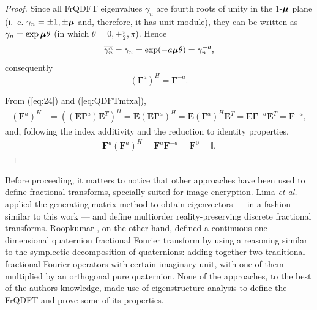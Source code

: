 \begin{itemize}
\begin{proof}
Since all FrQDFT eigenvalues $ \gamma_n $ are fourth roots of unity in the 1-$\boldsymbol{\mu} $ plane (i.~e. $ \gamma_n = \pm 1, \pm \boldsymbol{\mu} $ and, therefore, it has unit module), they can be written as $ \gamma_n = \exp \boldsymbol{\mu} \theta $ (in which $ \theta = 0, \pm \frac{\pi}{2}, \pi $). Hence
\begin{equation}
\overline{\gamma^a_n} = \gamma_n = \exp (-a \boldsymbol{\mu} \theta) = \gamma^{-a}_n,
\end{equation}
consequently
\begin{equation}
\label{eq:24}
(\mathbf{\Gamma}^a)^H = \mathbf{\Gamma}^{-a}.
\end{equation}

From (\ref{eq:24}) and (\ref{eq:QDFTmtxa}),
\begin{equation}
\begin{aligned}
(\mathbf{F}^a)^H &=  \left((\mathbf{E} \mathbf{\Gamma}^a) \mathbf{E}^T \right)^H =  \mathbf{E} \left(\mathbf{E} \mathbf{\Gamma}^a  \right)^H =
\mathbf{E} (\mathbf{\Gamma}^{a})^H \mathbf{E}^T = \mathbf{E} \mathbf{\Gamma}^{-a} \mathbf{E}^T = \mathbf{F}^{-a},
\end{aligned}
\end{equation}
and, following the index additivity and the reduction to identity properties,
\begin{equation}
\begin{aligned}
\mathbf{F}^a (\mathbf{F}^a)^H = \mathbf{F}^a \mathbf{F}^{-a} = \mathbf{F}^0= \mathbb{I}.
\end{aligned}
\end{equation}
\end{proof}
\end{itemize}

Before proceeding, it matters to notice that other approaches have been used to define fractional transforms, specially suited for image encryption. Lima \textit{et al.} \cite{figueiredo2018} applied the generating matrix method to obtain eigenvectors --- in a fashion similar to this work --- and define multiorder reality-preserving discrete fractional transforms. Roopkumar \cite{roopkumar2016quaternionic}, on the other hand, defined a {continuous} one-dimensional quaternion fractional Fourier transform by using a reasoning similar to the symplectic decomposition of quaternions: adding together two traditional fractional Fourier operators with certain imaginary unit, with one of them multiplied by an orthogonal pure quaternion. None of the approaches, to the best of the authors knowledge, made use of eigenstructure analysis to define the FrQDFT and prove some of its properties.

